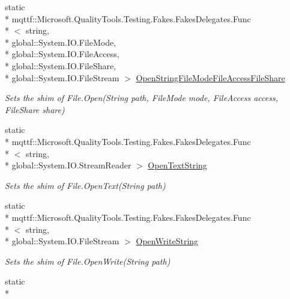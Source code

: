 \begin{DoxyCompactItemize}
static \\*
mqttf\-::\-Microsoft.\-Quality\-Tools.\-Testing.\-Fakes.\-Fakes\-Delegates.\-Func\\*
$<$ string, \\*
global\-::\-System.\-I\-O.\-File\-Mode, \\*
global\-::\-System.\-I\-O.\-File\-Access, \\*
global\-::\-System.\-I\-O.\-File\-Share, \\*
global\-::\-System.\-I\-O.\-File\-Stream $>$ \hyperlink{class_system_1_1_i_o_1_1_fakes_1_1_shim_file_af584dac5eca163a714c3332674c741dc}{Open\-String\-File\-Mode\-File\-Access\-File\-Share}
\begin{DoxyCompactList}\small\item\em Sets the shim of File.\-Open(\-String path, File\-Mode mode, File\-Access access, File\-Share share)\end{DoxyCompactList}\item 
static \\*
mqttf\-::\-Microsoft.\-Quality\-Tools.\-Testing.\-Fakes.\-Fakes\-Delegates.\-Func\\*
$<$ string, \\*
global\-::\-System.\-I\-O.\-Stream\-Reader $>$ \hyperlink{class_system_1_1_i_o_1_1_fakes_1_1_shim_file_a43e5724653b410595910ea804329b002}{Open\-Text\-String}
\begin{DoxyCompactList}\small\item\em Sets the shim of File.\-Open\-Text(\-String path)\end{DoxyCompactList}\item 
static \\*
mqttf\-::\-Microsoft.\-Quality\-Tools.\-Testing.\-Fakes.\-Fakes\-Delegates.\-Func\\*
$<$ string, \\*
global\-::\-System.\-I\-O.\-File\-Stream $>$ \hyperlink{class_system_1_1_i_o_1_1_fakes_1_1_shim_file_a81d6b0c88403008f26f0f3946eced0f8}{Open\-Write\-String}
\begin{DoxyCompactList}\small\item\em Sets the shim of File.\-Open\-Write(\-String path)\end{DoxyCompactList}\item 
static \\*

\end{DoxyCompactItemize}
